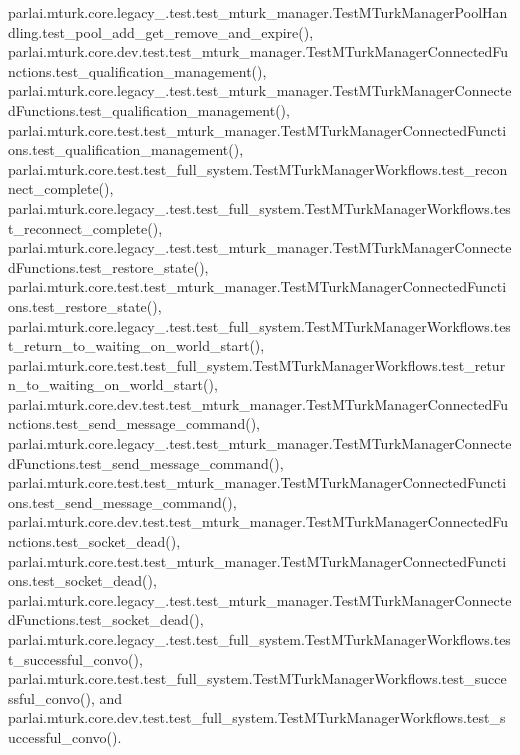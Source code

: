 parlai.\+mturk.\+core.\+legacy\+\_.\+test.\+test\+\_\+mturk\+\_\+manager.\+Test\+M\+Turk\+Manager\+Pool\+Handling.\+test\+\_\+pool\+\_\+add\+\_\+get\+\_\+remove\+\_\+and\+\_\+expire(), parlai.\+mturk.\+core.\+dev.\+test.\+test\+\_\+mturk\+\_\+manager.\+Test\+M\+Turk\+Manager\+Connected\+Functions.\+test\+\_\+qualification\+\_\+management(), parlai.\+mturk.\+core.\+legacy\+\_.\+test.\+test\+\_\+mturk\+\_\+manager.\+Test\+M\+Turk\+Manager\+Connected\+Functions.\+test\+\_\+qualification\+\_\+management(), parlai.\+mturk.\+core.\+test.\+test\+\_\+mturk\+\_\+manager.\+Test\+M\+Turk\+Manager\+Connected\+Functions.\+test\+\_\+qualification\+\_\+management(), parlai.\+mturk.\+core.\+test.\+test\+\_\+full\+\_\+system.\+Test\+M\+Turk\+Manager\+Workflows.\+test\+\_\+reconnect\+\_\+complete(), parlai.\+mturk.\+core.\+legacy\+\_.\+test.\+test\+\_\+full\+\_\+system.\+Test\+M\+Turk\+Manager\+Workflows.\+test\+\_\+reconnect\+\_\+complete(), parlai.\+mturk.\+core.\+legacy\+\_.\+test.\+test\+\_\+mturk\+\_\+manager.\+Test\+M\+Turk\+Manager\+Connected\+Functions.\+test\+\_\+restore\+\_\+state(), parlai.\+mturk.\+core.\+test.\+test\+\_\+mturk\+\_\+manager.\+Test\+M\+Turk\+Manager\+Connected\+Functions.\+test\+\_\+restore\+\_\+state(), parlai.\+mturk.\+core.\+legacy\+\_.\+test.\+test\+\_\+full\+\_\+system.\+Test\+M\+Turk\+Manager\+Workflows.\+test\+\_\+return\+\_\+to\+\_\+waiting\+\_\+on\+\_\+world\+\_\+start(), parlai.\+mturk.\+core.\+test.\+test\+\_\+full\+\_\+system.\+Test\+M\+Turk\+Manager\+Workflows.\+test\+\_\+return\+\_\+to\+\_\+waiting\+\_\+on\+\_\+world\+\_\+start(), parlai.\+mturk.\+core.\+dev.\+test.\+test\+\_\+mturk\+\_\+manager.\+Test\+M\+Turk\+Manager\+Connected\+Functions.\+test\+\_\+send\+\_\+message\+\_\+command(), parlai.\+mturk.\+core.\+legacy\+\_.\+test.\+test\+\_\+mturk\+\_\+manager.\+Test\+M\+Turk\+Manager\+Connected\+Functions.\+test\+\_\+send\+\_\+message\+\_\+command(), parlai.\+mturk.\+core.\+test.\+test\+\_\+mturk\+\_\+manager.\+Test\+M\+Turk\+Manager\+Connected\+Functions.\+test\+\_\+send\+\_\+message\+\_\+command(), parlai.\+mturk.\+core.\+dev.\+test.\+test\+\_\+mturk\+\_\+manager.\+Test\+M\+Turk\+Manager\+Connected\+Functions.\+test\+\_\+socket\+\_\+dead(), parlai.\+mturk.\+core.\+test.\+test\+\_\+mturk\+\_\+manager.\+Test\+M\+Turk\+Manager\+Connected\+Functions.\+test\+\_\+socket\+\_\+dead(), parlai.\+mturk.\+core.\+legacy\+\_.\+test.\+test\+\_\+mturk\+\_\+manager.\+Test\+M\+Turk\+Manager\+Connected\+Functions.\+test\+\_\+socket\+\_\+dead(), parlai.\+mturk.\+core.\+legacy\+\_.\+test.\+test\+\_\+full\+\_\+system.\+Test\+M\+Turk\+Manager\+Workflows.\+test\+\_\+successful\+\_\+convo(), parlai.\+mturk.\+core.\+test.\+test\+\_\+full\+\_\+system.\+Test\+M\+Turk\+Manager\+Workflows.\+test\+\_\+successful\+\_\+convo(), and parlai.\+mturk.\+core.\+dev.\+test.\+test\+\_\+full\+\_\+system.\+Test\+M\+Turk\+Manager\+Workflows.\+test\+\_\+successful\+\_\+convo().

